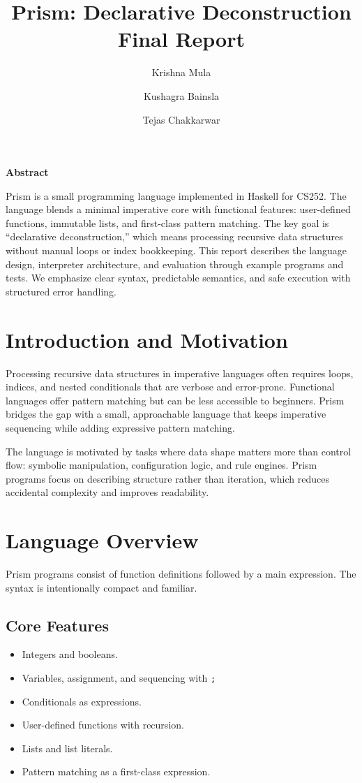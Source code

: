 \documentclass[11pt]{article}
\title{Prism: Declarative Deconstruction\\Final Report}
\author{Krishna Mula \and Kushagra Bainsla \and Tejas Chakkarwar}
\date{}
\renewenvironment{abstract}{%
  \par\noindent\textbf{Abstract}\par\noindent\normalsize
}{\par}
\begin{document}
\maketitle

\begin{abstract}
Prism is a small programming language implemented in Haskell for CS252. The language blends a minimal imperative core with functional features: user-defined functions, immutable lists, and first-class pattern matching. The key goal is ``declarative deconstruction,'' which means processing recursive data structures without manual loops or index bookkeeping. This report describes the language design, interpreter architecture, and evaluation through example programs and tests. We emphasize clear syntax, predictable semantics, and safe execution with structured error handling.
\end{abstract}

\section{Introduction and Motivation}
Processing recursive data structures in imperative languages often requires loops, indices, and nested conditionals that are verbose and error-prone. Functional languages offer pattern matching but can be less accessible to beginners. Prism bridges the gap with a small, approachable language that keeps imperative sequencing while adding expressive pattern matching.

The language is motivated by tasks where data shape matters more than control flow: symbolic manipulation, configuration logic, and rule engines. Prism programs focus on describing structure rather than iteration, which reduces accidental complexity and improves readability.

\section{Language Overview}
Prism programs consist of function definitions followed by a main expression. The syntax is intentionally compact and familiar.

\subsection{Core Features}
\begin{itemize}[leftmargin=1.2em]
  \item Integers and booleans.
  \item Variables, assignment, and sequencing with \texttt{;}
  \item Conditionals as expressions.
  \item User-defined functions with recursion.
  \item Lists and list literals.
  \item Pattern matching as a first-class expression.
\end{itemize}
\end{document}
